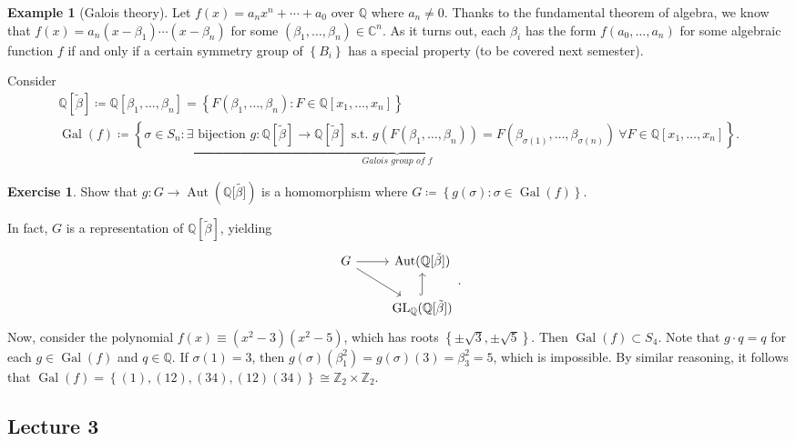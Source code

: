 \documentclass[10pt,letterpaper,cm]{nupset}
\theoremstyle{definition}
\newtheorem{exmp}[definition]{Example}
\theoremstyle{theorem}
\newtheorem{exercise}[definition]{Exercise}
\theoremstyle{remark}
\newcommand{\C}{\mathbb C}
\newcommand{\Q}{\mathbb Q}
\newcommand{\Z}{\mathbb Z}
\newcommand{\1}{\mathbf{1}}
\newcommand{\0}{\vec 0}
\DeclareMathOperator*{\GL}{GL}
\DeclareMathOperator{\gal}{Gal}
\DeclareMathOperator{\aut}{Aut}
\begin{document}
\begin{exmp}[Galois theory]
Let $f(x) = a_nx^n + \cdots + a_0$ over $\Q$ where $a_n \ne 0$. Thanks to the fundamental theorem of algebra, we know that $f(x) = a_n(x-\beta_1)\cdots (x-\beta_n)$ for some $(\beta_1, \ldots, \beta_n) \in \C^n$. As it turns out, each $\beta_i$ has the form $f(a_0, \ldots, a_n)$ for some algebraic function $f$  if and only if a certain symmetry group of $\left\{B_i\right\}$ has a special property (to be covered next semester).

\smallskip

Consider 
\begin{gather*}
\Q\left[\tilde{\beta}\right]  \coloneqq  \Q[\beta_1, \ldots, \beta_n] = \left\{F(\beta_1, \ldots, \beta_n) : F \in \Q[x_1, \ldots, x_n]\right\} \\ \underbrace{\gal(f)  \coloneqq  \left\{\sigma \in S_n : \exists\text{ bijection } g : \Q\left[\tilde{\beta}\right] \to \Q\left[\tilde{\beta}\right] \text{ s.t. }  g(F(\beta_1, \ldots, \beta_n)) = F(\beta_{\sigma(1)}, \ldots, \beta_{\sigma(n)})\  \forall{F} \in \Q[x_1, \ldots, x_n]\right\}}_{\textit{Galois group of }f}.
\end{gather*}

\begin{exercise}
Show that $g: G \to \aut(\Q[\tilde{\beta]})$ is a homomorphism where $G \coloneqq  \left\{g(\sigma): \sigma \in \gal(f)\right\}$.
\end{exercise}

\smallskip

In fact, $G$ is a representation of $\Q[\tilde{\beta}]$, yielding
\[ \begin{tikzcd}
G \arrow{r} \arrow[swap]{dr} & \aut(\Q[\tilde{\beta}]) \\%
 & \GL_\Q(\Q[\tilde{\beta}]) \arrow[hookrightarrow]{u}
\end{tikzcd}.
\]
Now, consider the polynomial $f(x) \equiv (x^2 -3)(x^2 -5)$, which has roots $\left\{\pm \sqrt{3}, \pm \sqrt{5}\right\}$. Then $\gal(f) \subset S_4$. Note that $g\cdot q= q$ for each $g \in \gal(f)$ and $q\in \Q$. If $\sigma(1) =3$, then $g(\sigma)(\beta_1^2) = g(\sigma)  (3) = \beta_3^2 = 5$, which is impossible. By similar reasoning, it follows that $\gal(f) = \left\{(1), (1 2), (3 4), (1 2)(3 4)\right\} \cong \Z_2 \times \Z_2$.
\end{exmp}

\subsection{Lecture 3}
\end{document}
